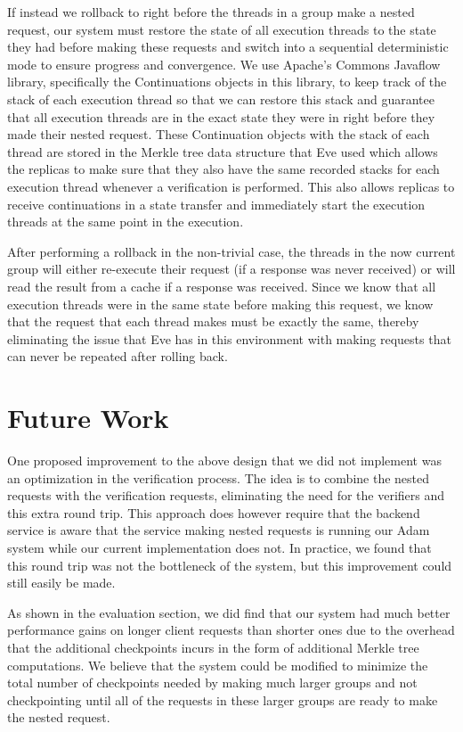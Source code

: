 \documentclass[11pt, oneside]{report}
\begin{document}
If instead we rollback to right before the threads in a group make a nested request, our system must restore the state of all execution threads to the state they had before making these requests and switch into a sequential deterministic mode to ensure progress and convergence. 
We use Apache's Commons Javaflow library, specifically the Continuations objects in this library, to keep track of the stack of each execution thread so that we can restore this stack and guarantee that all execution threads are in the exact state they were in right before they made their nested request. 
These Continuation objects with the stack of each thread are stored in the Merkle tree data structure that Eve used which allows the replicas to make sure that they also have the same recorded stacks for each execution thread whenever a verification is performed. 
This also allows replicas to receive continuations in a state transfer and immediately start the execution threads at the same point in the execution. 


After performing a rollback in the non-trivial case, the threads in the now current group will either re-execute their request (if a response was never received) or will read the result from a cache if a response was received. 
Since we know that all execution threads were in the same state before making this request, we know that the request that each thread makes must be exactly the same, thereby eliminating the issue that Eve has in this environment with making requests that can never be repeated after rolling back.

\section{Future Work}

One proposed improvement to the above design that we did not implement was an optimization in the verification process. 
The idea is to combine the nested requests with the verification requests, eliminating the need for the verifiers and this extra round trip. 
This approach does however require that the backend service is aware that the service making nested requests is running our Adam system while our current implementation does not. 
In practice, we found that this round trip was not the bottleneck of the system, but this improvement could still easily be made.

As shown in the evaluation section, we did find that our system had much better performance gains on longer client requests than shorter ones due to the overhead that the additional checkpoints incurs in the form of additional Merkle tree computations. 
We believe that the system could be modified to minimize the total number of checkpoints needed by making much larger groups and not checkpointing until all of the requests in these larger groups are ready to make the nested request.
\end{document}
